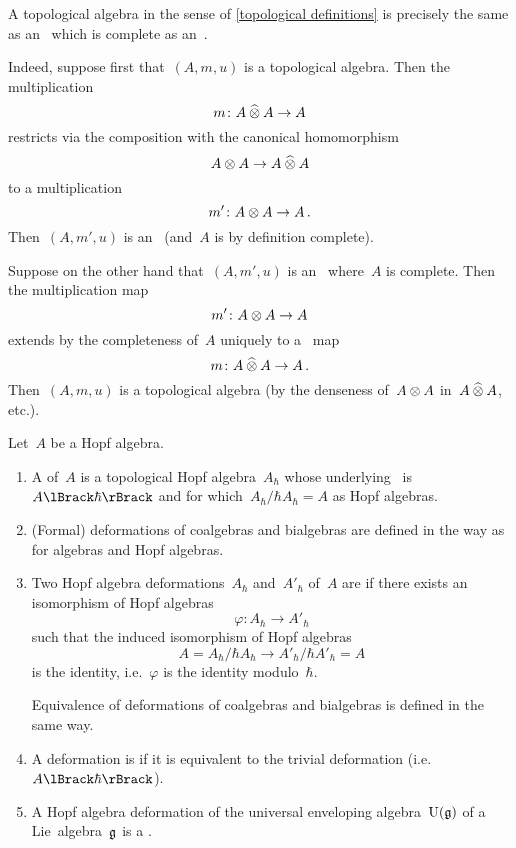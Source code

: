 \documentclass[a4paper, 11pt, oneside]{scrartcl}
\begin{document}
\begin{remark}
  A topological algebra in the sense of \cref{topological definitions} is precisely the same as an~\algebra{$\kfhbar$} which is complete as an~\module{$\kfhbar$}.

  Indeed, suppose first that~$(A, m, u)$ is a topological algebra.
  Then the multiplication
  \[
    m \colon A \mathbin{\widehat{\otimes}} A \to A
  \]
  restricts via the composition with the canonical homomorphism
  \[
    A \otimes A
    \to
    A \mathbin{\widehat{\otimes}} A
  \]
  to a multiplication
  \[
    m'
    \colon
    A \otimes A
    \to
    A \,.
  \]
  Then~$(A, m', u)$ is an~\algebra{$\kfhbar$} (and~$A$ is by definition complete).

  Suppose on the other hand that~$(A, m', u)$ is an~\algebra{$\kfhbar$} where~$A$ is complete.
  Then the multiplication map
  \[
    m'
    \colon
    A \otimes A
    \to
    A
  \]
  extends by the completeness of~$A$ uniquely to a~\linear{$\kfhbar$} map
  \[
    m
    \colon
    A \mathbin{\widehat{\otimes}} A
    \to
    A \,.
  \]
  Then~$(A, m, u)$ is a topological algebra (by the denseness of~$A \otimes A$ in~$A \mathbin{\widehat{\otimes}} A$, etc.).
\end{remark}

\begin{definition}
  Let~$A$ be a Hopf algebra.
  \begin{enumerate}
    \item
      A  of~$A$ is a topological Hopf algebra~$A_{\hbar}$ whose underlying~\module{$\kfhbar$} is~$\power{A}{\hbar}$ and for which~$A_\hbar / \hbar A_\hbar = A$ as Hopf algebras.
    \item
      (Formal) deformations of coalgebras and bialgebras are defined in the way as for algebras and Hopf algebras.
    \item
      Two Hopf algebra deformations~$A_\hbar$ and~$A'_\hbar$ of~$A$ are  if there exists an isomorphism of Hopf algebras
      \[
        \varphi
        \colon
        A_\hbar
        \to
        A'_\hbar
      \]
      such that the induced isomorphism of Hopf algebras
      \[
        A
        =
        A_\hbar / \hbar A_\hbar
        \to
        A'_\hbar / \hbar A'_\hbar
        = A
      \]
      is the identity, i.e.~$\varphi$ is the identity modulo~$\hbar$.

      Equivalence of deformations of coalgebras and bialgebras is defined in the same way.
    \item
      A deformation is  if it is equivalent to the trivial deformation (i.e.~$\power{A}{\hbar}$).
    \item
      A Hopf algebra deformation of the universal enveloping algebra~$\operatorname{U}(\mathfrak{g})$ of a Lie~algebra~$\mathfrak{g}$ is a .
  \end{enumerate}
\end{definition}
\end{document}
